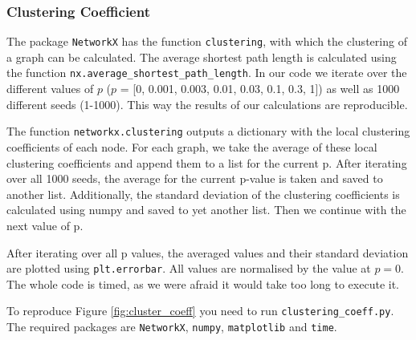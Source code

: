 \subsubsection{Clustering Coefficient}
The package \verb+NetworkX+ has the function \verb+clustering+, with which the clustering of a graph can be calculated. 
The average shortest path length is calculated using the function \verb+nx.average_shortest_path_length+.
In our code we iterate over the different values of $p$ ($p$ = [0, 0.001, 0.003, 0.01, 0.03, 0.1, 0.3, 1]) as well as 1000 different seeds (1-1000). 
This way the results of our calculations are reproducible. 

The function \verb+networkx.clustering+ outputs a dictionary with the local clustering coefficients of each node. 
For each graph, we take the average of these local clustering coefficients and append them to a list for the current p. 
After iterating over all 1000 seeds, the average for the current p-value is taken and saved to another list.
Additionally, the standard deviation of the clustering coefficients is calculated using numpy and saved to yet another list. 
Then we continue with the next value of p. 

After iterating over all p values, the averaged values and their standard deviation are plotted using \verb+plt.errorbar+. 
All values are normalised by the value at $p=0$.
The whole code is timed, as we were afraid it would take too long to execute it.

To reproduce Figure \ref{fig:cluster_coeff} you need to run \verb+clustering_coeff.py+.
The required packages are \verb+NetworkX+, \verb+numpy+, \verb+matplotlib+ and \verb+time+.
